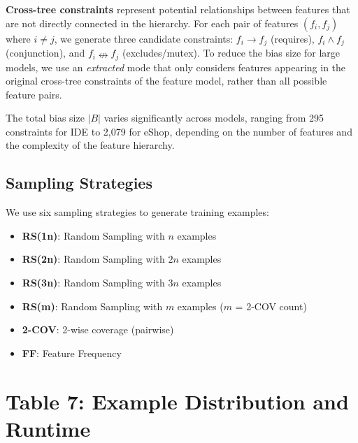 \documentclass[11pt]{article}
\begin{document}
\textbf{Cross-tree constraints} represent potential relationships between features that are not directly connected in the hierarchy. For each pair of features $(f_i, f_j)$ where $i \neq j$, we generate three candidate constraints: $f_i \rightarrow f_j$ (requires), $f_i \land f_j$ (conjunction), and $f_i \nleftrightarrow f_j$ (excludes/mutex). To reduce the bias size for large models, we use an \emph{extracted} mode that only considers features appearing in the original cross-tree constraints of the feature model, rather than all possible feature pairs.

The total bias size $|B|$ varies significantly across models, ranging from 295 constraints for IDE to 2,079 for eShop, depending on the number of features and the complexity of the feature hierarchy.

\subsection{Sampling Strategies}
We use six sampling strategies to generate training examples:

\begin{itemize}
    \item \textbf{RS(1n)}: Random Sampling with $n$ examples
    \item \textbf{RS(2n)}: Random Sampling with $2n$ examples
    \item \textbf{RS(3n)}: Random Sampling with $3n$ examples
    \item \textbf{RS(m)}: Random Sampling with $m$ examples ($m$ = 2-COV count)
    \item \textbf{2-COV}: 2-wise coverage (pairwise)
    \item \textbf{FF}: Feature Frequency
\end{itemize}

\section{Table 7: Example Distribution and Runtime}
\end{document}
